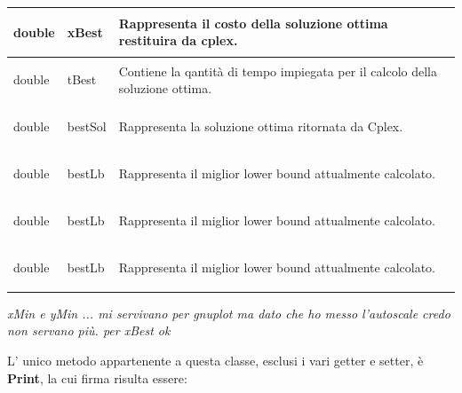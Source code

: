 \documentclass[11pt]{article}
\begin{document}
\begin{center}
\begin{longtable}{ | p{4cm} | p{4cm} | p{7cm} |}
    \begin{center} double \end{center} & \begin{center} xBest \end{center}& \vfill Rappresenta il costo della soluzione ottima restituira da cplex.\vfill \\ \hline
    \begin{center} double \end{center} & \begin{center} tBest \end{center}& \vfill Contiene la qantità di tempo impiegata per il calcolo della soluzione ottima. \vfill \\ \hline
    \begin{center} double \end{center} & \begin{center} bestSol \end{center}& \vfill Rappresenta la soluzione ottima ritornata da Cplex.\vfill \\ \hline
     \begin{center} double \end{center} & \begin{center} bestLb \end{center}& \vfill Rappresenta il miglior lower bound attualmente calcolato.\vfill \\ \hline
    \begin{center} double \end{center} & \begin{center} bestLb \end{center}& \vfill Rappresenta il miglior lower bound attualmente calcolato.\vfill \\ \hline
     \begin{center} double \end{center} & \begin{center} bestLb \end{center}& \vfill Rappresenta il miglior lower bound attualmente calcolato.\vfill \\ \hline
    \end{longtable}
\end{center}

\textit{xMin e yMin ... mi servivano per gnuplot ma dato che ho messo l'autoscale credo non servano più. per xBest ok}

L' unico metodo appartenente a questa classe, esclusi i vari getter e setter, è \textbf{Print}, la cui firma risulta essere:
\end{document}
